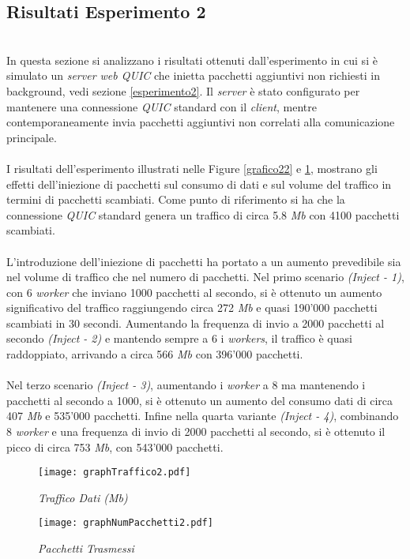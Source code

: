 \subsection{Risultati Esperimento 2}
~\\
\indent In questa sezione si analizzano i risultati ottenuti dall'esperimento in cui si è simulato un \emph{server web QUIC} che inietta pacchetti aggiuntivi non richiesti in background, vedi sezione \ref{esperimento2}.
Il \emph{server} è stato configurato per mantenere una connessione \emph{QUIC} standard con il \emph{client}, mentre contemporaneamente invia pacchetti aggiuntivi non correlati alla comunicazione principale.
\\\\
I risultati dell'esperimento illustrati nelle Figure \ref{grafico22} e \ref{grafico2}, mostrano gli effetti dell'iniezione di pacchetti sul consumo di dati e sul volume del traffico in termini di pacchetti scambiati.
Come punto di riferimento si ha che la connessione \emph{QUIC} standard genera un traffico di circa 5.8 \emph{Mb} con 4100 pacchetti scambiati.
\\\\
L'introduzione dell'iniezione di pacchetti ha portato a un aumento prevedibile sia nel volume di traffico che nel numero di pacchetti.
Nel primo scenario \emph{(Inject - 1)}, con 6 \emph{worker} che inviano 1000 pacchetti al secondo, si è ottenuto un aumento significativo del traffico raggiungendo circa 272 \emph{Mb} e quasi 190'000 pacchetti scambiati in 30 secondi. 
Aumentando la frequenza di invio a 2000 pacchetti al secondo \emph{(Inject - 2)} e mantendo sempre a 6 i \emph{workers}, il traffico è quasi raddoppiato, arrivando a circa 566 \emph{Mb} con 396'000 pacchetti.
\\\\
Nel terzo scenario \emph{(Inject - 3)}, aumentando i \emph{worker} a 8 ma mantenendo i pacchetti al secondo a 1000, si è ottenuto un aumento del consumo dati di circa 407 \emph{Mb} e 535'000 pacchetti. 
Infine nella quarta variante \emph{(Inject - 4)}, combinando 8 \emph{worker} e una frequenza di invio di 2000 pacchetti al secondo, si è ottenuto il picco di circa 753 \emph{Mb}, con 543'000 pacchetti.
\begin{figure}[!h]
    \centering
    \begin{minipage}{0.48\textwidth}
        \centering
        \texttt{[image: graphTraffico2.pdf]}
        \caption{\emph{Traffico Dati (Mb)}}
        \label{grafico22}
    \end{minipage}
    \hfill
    \begin{minipage}{0.48\textwidth}
        \centering
        \texttt{[image: graphNumPacchetti2.pdf]}
        \caption{\emph{Pacchetti Trasmessi}}
        \label{grafico2}
    \end{minipage}
\end{figure}
